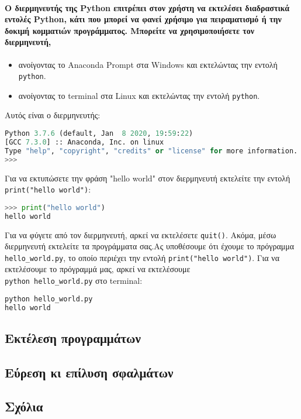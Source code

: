 \documentclass[a4paper,14pt]{extreport}
\begin{document}
\paragraph{
    Ο διερμηνευτής της Python επιτρέπει στον χρήστη να εκτελέσει διαδραστικά
    εντολές Python, κάτι που μπορεί να φανεί χρήσιμο για πειραματισμό ή
    την δοκιμή κομματιών προγράμματος. Μπορείτε να χρησιμοποιήσετε τον
    διερμηνευτή,
}
\begin{itemize}
    \item ανοίγοντας το Anaconda Prompt στα Windows και εκτελώντας την εντολή
          \lstinline{python}.
    \item ανοίγοντας το terminal στα Linux και εκτελώντας την εντολή
          \lstinline{python}.
\end{itemize}
Αυτός είναι ο διερμηνευτής:
\begin{lstlisting}[language=Python]
Python 3.7.6 (default, Jan  8 2020, 19:59:22)
[GCC 7.3.0] :: Anaconda, Inc. on linux
Type "help", "copyright", "credits" or "license" for more information.
>>>
\end{lstlisting}
Για να εκτυπώσετε την φράση "hello world" στον διερμηνευτή εκτελείτε  την
εντολή \\
\lstinline{print("hello world")}:
\begin{lstlisting}[language=Python]
>>> print("hello world")
hello world
\end{lstlisting}
Για να φύγετε από τον διερμηνευτή, αρκεί να εκτελέσετε
\lstinline{quit()}.
Ακόμα, μέσω διερμηνευτή εκτελείτε τα προγράμματα σας.Ας υποθέσουμε ότι
έχουμε το πρόγραμμα \lstinline{hello_world.py},
το οποίο περιέχει την εντολή \lstinline{print("hello world")}.
Για να εκτελέσουμε το πρόγραμμά μας, αρκεί να εκτελέσουμε \\
\lstinline{python hello_world.py}
στο terminal:
\begin{lstlisting}[language=Python]
python hello_world.py
hello world    
\end{lstlisting}
\subsection{Εκτέλεση προγραμμάτων}
\subsection{Εύρεση κι επίλυση σφαλμάτων}
\subsection{Σχόλια}
\end{document}
